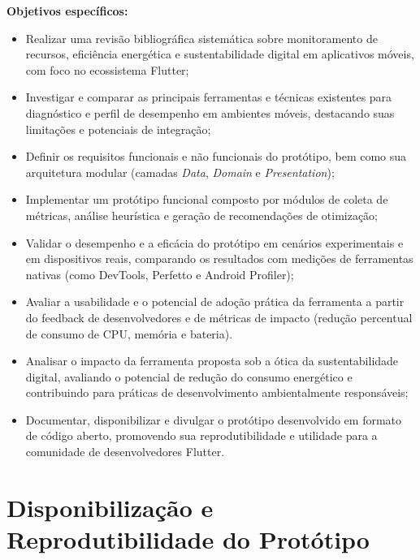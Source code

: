 \documentclass[12pt,a4paper,oneside]{abntex2}
\begin{document}
\noindent\textbf{Objetivos específicos:}
\begin{itemize}
  \item Realizar uma revisão bibliográfica sistemática sobre monitoramento de recursos, eficiência energética e sustentabilidade digital em aplicativos móveis, com foco no ecossistema Flutter;
  
  \item Investigar e comparar as principais ferramentas e técnicas existentes para diagnóstico e perfil de desempenho em ambientes móveis, destacando suas limitações e potenciais de integração;
  
  \item Definir os requisitos funcionais e não funcionais do protótipo, bem como sua arquitetura modular (camadas \textit{Data}, \textit{Domain} e \textit{Presentation});
  
  \item Implementar um protótipo funcional composto por módulos de coleta de métricas, análise heurística e geração de recomendações de otimização;
  
  \item Validar o desempenho e a eficácia do protótipo em cenários experimentais e em dispositivos reais, comparando os resultados com medições de ferramentas nativas (como DevTools, Perfetto e Android Profiler);
  
  \item Avaliar a usabilidade e o potencial de adoção prática da ferramenta a partir do feedback de desenvolvedores e de métricas de impacto (redução percentual de consumo de CPU, memória e bateria).
  
    \item Analisar o impacto da ferramenta proposta sob a ótica da sustentabilidade digital, avaliando o potencial de redução do consumo energético e contribuindo para práticas de desenvolvimento ambientalmente responsáveis;

  \item Documentar, disponibilizar e divulgar o protótipo desenvolvido em formato de código aberto, promovendo sua reprodutibilidade e utilidade para a comunidade de desenvolvedores Flutter.

\end{itemize}
\section{Disponibilização e Reprodutibilidade do Protótipo}
\end{document}
